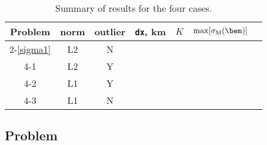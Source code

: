 \documentclass[11pt,titlepage,fleqn]{article}
\begin{document}
\begin{table}[h]
\centering
\caption[]{
Summary of results for the four cases.
\label{tab}
}
\begin{spacing}{1.5}
\begin{tabular}{|c||c|c|c|c|c|c}
\hline\hline
Problem & norm & outlier & \verb+dx+, km & $K$ & $\max[\sigma_{\rm M}(\bem)]$ \\ \hline\hline
2-\ref{sigma1} & L2 & N & \hspace{1cm} & \hspace{3cm} & \hspace{3cm} \\ \hline
4-1            & L2 & Y &  &  & \\ \hline
4-2            & L1 & Y &  &  & \\ \hline
4-3            & L1 & N &  &  & \\ \hline
\end{tabular}
\end{spacing}
\end{table}


\pagebreak
\subsection*{Problem} \howmuchtime\





\end{document}
